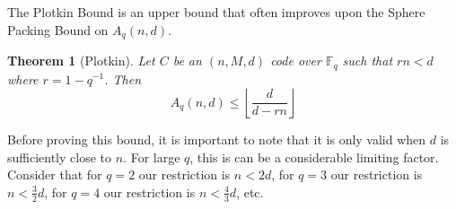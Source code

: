 \documentclass{article}
\newtheorem{theorem}{Theorem}
\theoremstyle{definition}
\numberwithin{exmp}{subsection}
\begin{document}
The Plotkin Bound is an upper bound that often improves upon the Sphere Packing Bound on $A_q(n,d)$.

\begin{theorem}[Plotkin]
Let $C$ be an $(n,M,d)$ code over $\mathbb{F}_q$ such that $rn < d$ where $r = 1 - q^{-1}$.  Then
\begin{equation}
A_q(n,d) \le \left \lfloor \frac{d}{d-rn}\right\rfloor
\end{equation}
\end{theorem}

Before proving this bound, it is important to note that it is only valid when $d$ is sufficiently close to $n$.  For large $q$, this is can be a considerable limiting factor.
Consider that for $q=2$ our restriction is $n<2d$,  for $q=3$ our restriction is $n<\frac{3}{2}d$, for $q=4$ our restriction is $n<\frac{4}{3}d$, etc.
\end{document}
